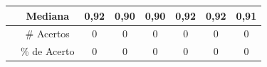 \begin{quadro}[h]
\begin{tabular}{c|c|c|c|c|c|c|c|}
\multicolumn{1}{|c|}{}                                                                                   & Mediana      & \textbf{0,92}                                       & 0,90                                                 & 0,90                                                   & \textbf{0,92}                                           & \textbf{0,92}  & 0,91      \\ \hline
\multicolumn{1}{l|}{}                                                                                    & \# Acertos   & 0                                                   & 0                                                    & 0                                                      & 0                                                       & 0              & 0         \\ \cline{2-8} 
\multicolumn{1}{l|}{}                                                                                    & \% de Acerto & 0                                                   & 0                                                    & 0                                                      & 0                                                       & 0              & 0         \\ \cline{2-8} 
\end{tabular}
\end{quadro}

